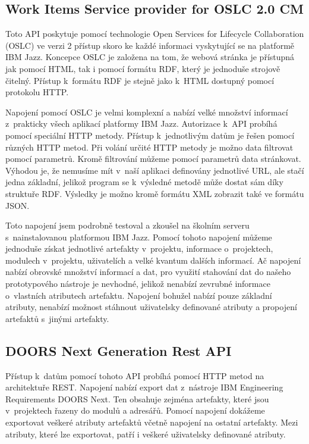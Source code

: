 \documentclass[czech,master]{diploma}
\begin{document}
\subsection{Work Items Service provider for OSLC 2.0 CM}
Toto API poskytuje pomocí technologie Open Services for Lifecycle Collaboration (OSLC) ve verzi 2 přístup skoro ke každé informaci vyskytující se na platformě IBM Jazz. Koncepce OSLC je založena na tom, že webová stránka je přístupná jak pomocí HTML, tak i pomocí formátu RDF, který je jednoduše strojově čitelný. Přístup k~formátu RDF je stejně jako k~HTML dostupný pomocí protokolu HTTP.

Napojení pomocí OSLC je velmi komplexní a nabízí velké množství informací z~prakticky všech aplikací platformy IBM Jazz. Autorizace k~API probíhá pomocí speciální HTTP metody. Přístup k~jednotlivým datům je řešen pomocí různých HTTP metod. Při volání určité HTTP metody je možno data filtrovat pomocí parametrů. Kromě filtrování můžeme pomocí parametrů data stránkovat. Výhodou je, že nemusíme mít v~naší aplikaci definovány jednotlivé URL, ale stačí jedna základní, jelikož program se k~výsledné metodě může dostat sám díky struktuře RDF. Výsledky je možno kromě formátu XML zobrazit také ve formátu JSON.

Toto napojení jsem podrobně testoval a zkoušel na školním serveru s~nainstalovanou platformou IBM Jazz. Pomocí tohoto napojení můžeme jednoduše získat jednotlivé artefakty v~projektu, informace o~projektech, modulech v~projektu, uživatelích a velké kvantum dalších informací. Ač napojení nabízí obrovské množství informací a dat, pro využití stahování dat do našeho prototypového nástroje je nevhodné, jelikož nenabízí zevrubné informace o~vlastních atributech artefaktu. Napojení bohužel nabízí pouze základní atributy, nenabízí možnost stáhnout uživatelsky definované atributy a propojení artefaktů s~jinými artefakty.

\subsection{DOORS Next Generation Rest API}
Přístup k~datům pomocí tohoto API probíhá pomocí HTTP metod na architektuře REST. Napojení nabízí export dat z~nástroje IBM Engineering Requirements DOORS Next. Ten obsahuje zejména artefakty, které jsou v~projektech řazeny do modulů a adresářů. Pomocí napojení dokážeme exportovat veškeré atributy artefaktů včetně napojení na ostatní artefakty. Mezi atributy, které lze exportovat, patří i veškeré uživatelsky definované atributy.
\end{document}
